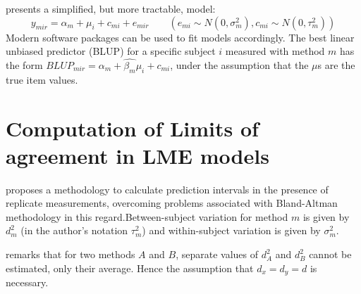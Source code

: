 \documentclass[12pt, a4paper]{report}
\theoremstyle{plain}
\theoremstyle{definition}
\theoremstyle{remark}
\begin{document}
	\citet{BXC2008} presents a simplified, but more tractable, model:
	\begin{equation}
	y_{mir}  = \alpha_{m} + \mu_{i} + c_{mi} + e_{mir} \qquad ( e_{mi}
	\sim N(0,\sigma^{2}_{m}), c_{mi} \sim N(0,\tau^{2}_{m}))
	\end{equation}
	Modern software packages can be used to fit models accordingly. The best linear unbiased predictor (BLUP) for a specific subject $i$ measured with method $m$ has the form $BLUP_{mir} = \hat{\alpha_{m}} +
	\hat{\beta_{m}}\mu_{i} + c_{mi}$, under the assumption that the
	$\mu$s are the true item values.
	
	
	
	
	
	
	\section{Computation of Limits of agreement in LME models}
	
	
	\citet{BXC2008} proposes a methodology to calculate prediction intervals in the presence of replicate measurements, overcoming problems associated with Bland-Altman methodology in this regard.Between-subject variation for method $m$ is given by $d^2_{m}$ (in the author's notation $\tau^2_m$) and within-subject variation is given by $\sigma^2_{m}$.  
	
	\citet{BXC2008} remarks that for two methods $A$ and $B$, separate values of $d^2_{A}$ and $d^2_{B}$ cannot be estimated, only their average. Hence the assumption that $d_{x}= d_{y}= d$ is necessary. %
	
\end{document}
